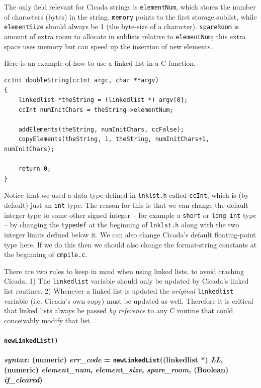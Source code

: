 \documentclass{article}
\newenvironment{code}{
       \begin{list}{}{
               \setlength{\leftmargin}{.4in}
               \setlength{\rightmargin}{0in}
               \setlength{\topsep}{.2in}
       }
       \small
       \item[] }
       { \end{list}   }
\begin{document}
\noindent The only field relevant for Cicada strings is \verb#elementNum#, which stores the number of characters (bytes) in the string.  \verb#memory# points to the first storage sublist, while \verb#elementSize# should always be 1 (the byte-size of a character).  \verb#spareRoom# is amount of extra room to allocate in sublists relative to \verb#elementNum#; this extra space uses memory but can speed up the insertion of new elements.

Here is an example of how to use a linked list in a C function.

\begin{code} \begin{verbatim}
ccInt doubleString(ccInt argc, char **argv)
{
    linkedlist *theString = (linkedlist *) argv[0];
    ccInt numInitChars = theString->elementNum;
    
    addElements(theString, numInitChars, ccFalse);
    copyElements(theString, 1, theString, numInitChars+1, numInitChars);
    
    return 0;
}
\end{verbatim} \end{code}

\noindent Notice that we used a data type defined in \verb#lnklst.h# called \verb#ccInt#, which is (by default) just an \verb#int# type.  The reason for this is that we can change the default integer type to some other signed integer -- for example a \verb#short# or \verb#long int# type -- by changing the \verb#typedef# at the beginning of \verb#lnklst.h# along with the two integer limits defined below it.  We can also change Cicada's default floating-point type here.  If we do this then we should also change the format-string constants at the beginning of \verb#cmpile.c#.

There are two rules to keep in mind when using linked lists, to avoid crashing Cicada.  1) The \verb#linkedlist# variable should only be updated by Cicada's linked list routines.  2) Whenever a linked list is updated the \emph{original} \verb#linkedlist# variable (i.e. Cicada's own copy) must be updated as well.  Therefore it is critical that linked lists always be passed \emph{by reference} to any C routine that could conceivably modify that list.\\


\paragraph{\texttt{newLinkedList()}\\\\
\normalfont \emph{syntax: } (numeric) \emph{err\_code} = \texttt{newLinkedList}((linkedlist *) \emph{LL}, (numeric) \emph{element\_num}, \emph{element\_size}, \emph{spare\_room}, (Boolean) \emph{if\_cleared})\\\\}
\end{document}
